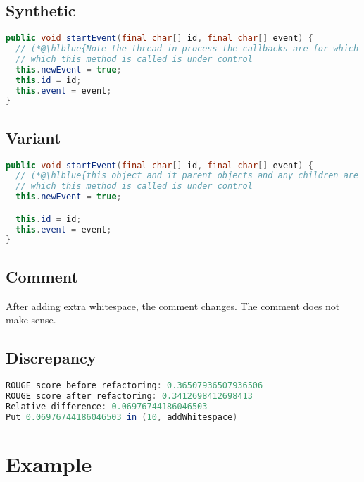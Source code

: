 \documentclass[11pt]{article}
\DeclareRobustCommand{\hlblue}[1]{{\sethlcolor{SeaGreen}\hl{#1}}}
\DeclareRobustCommand{\hlblue}[1]{{\sethlcolor{SkyBlue}\hl{#1}}}
\begin{document}
\subsection{Synthetic}

\begin{lstlisting}[language=java]
public void startEvent(final char[] id, final char[] event) {
  // (*@\hlblue{Note the thread in process the callbacks are for which event listeners and thus that it identifies a}@*)
  // which this method is called is under control
  this.newEvent = true;
  this.id = id;
  this.event = event;
}
\end{lstlisting}

\subsection{Variant}
\begin{lstlisting}[language=java]
public void startEvent(final char[] id, final char[] event) {
  // (*@\hlblue{this object and it parent objects and any children are hidden if a parent control the element whose object}@*)
  // which this method is called is under control
  this.newEvent = true;

  this.id = id;
  this.event = event;
}
\end{lstlisting}
\subsection{Comment}

After adding extra whitespace, the comment changes. The comment does not make sense.

\subsection{Discrepancy}

\begin{lstlisting}[language=java]
ROUGE score before refactoring: 0.36507936507936506
ROUGE score after refactoring: 0.3412698412698413
Relative difference: 0.06976744186046503
Put 0.06976744186046503 in (10, addWhitespace)
\end{lstlisting}





\pagebreak
\section{Example}
\end{document}
